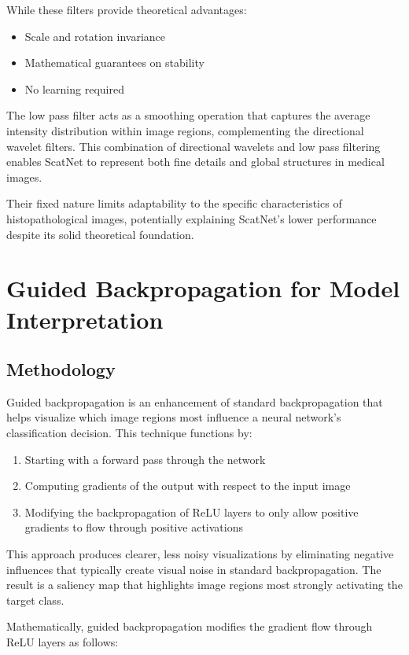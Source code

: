 \documentclass[10pt,twocolumn]{article}
\begin{document}
While these filters provide theoretical advantages:
\begin{itemize}
    \item Scale and rotation invariance
    \item Mathematical guarantees on stability
    \item No learning required
\end{itemize}

The low pass filter acts as a smoothing operation that captures the average intensity distribution within image regions, complementing the directional wavelet filters. This combination of directional wavelets and low pass filtering enables ScatNet to represent both fine details and global structures in medical images.

Their fixed nature limits adaptability to the specific characteristics of histopathological images, potentially explaining ScatNet's lower performance despite its solid theoretical foundation.

\section{Guided Backpropagation for Model Interpretation}
\subsection{Methodology}
Guided backpropagation is an enhancement of standard backpropagation that helps visualize which image regions most influence a neural network's classification decision. This technique functions by:

\begin{enumerate}
    \item Starting with a forward pass through the network
    \item Computing gradients of the output with respect to the input image
    \item Modifying the backpropagation of ReLU layers to only allow positive gradients to flow through positive activations
\end{enumerate}

This approach produces clearer, less noisy visualizations by eliminating negative influences that typically create visual noise in standard backpropagation. The result is a saliency map that highlights image regions most strongly activating the target class.

Mathematically, guided backpropagation modifies the gradient flow through ReLU layers as follows:
\end{document}
